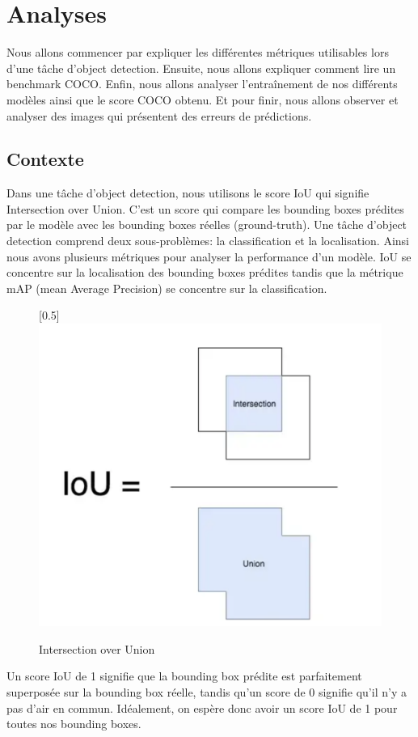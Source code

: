 \chapter{Analyses}
\label{chap:Evaluation}
Nous allons commencer par expliquer les différentes métriques utilisables lors d'une tâche d'object detection. Ensuite, nous allons expliquer comment lire un benchmark COCO. Enfin, nous allons analyser l'entraînement de nos différents modèles ainsi que le score COCO obtenu. Et pour finir, nous allons observer et analyser des images qui présentent des erreurs de prédictions.

\section{Contexte}
Dans une tâche d'object detection, nous utilisons le score IoU qui signifie Intersection over Union.
C'est un score qui compare les bounding boxes prédites par le modèle avec les bounding boxes réelles (ground-truth).
Une tâche d'object detection comprend deux sous-problèmes: la classification et la localisation.
Ainsi nous avons plusieurs métriques pour analyser la performance d'un modèle. IoU se concentre sur 
la localisation des bounding boxes prédites tandis que la métrique mAP (mean Average Precision) 
se concentre sur la classification.
\begin{figure}[bh!]
    \centering
    \scalebox{0.5}[0.5]{\includegraphics[width=\textwidth]{images/iou.png}}
    \caption{Intersection over Union}
    \label{fig:iou}
\end{figure}
Un score IoU de 1 signifie que la bounding box prédite est parfaitement superposée sur la bounding box réelle, tandis qu'un score de 0 signifie qu'il n'y a pas d'air en commun. Idéalement, on espère donc avoir un score IoU de 1 pour toutes nos bounding boxes.


